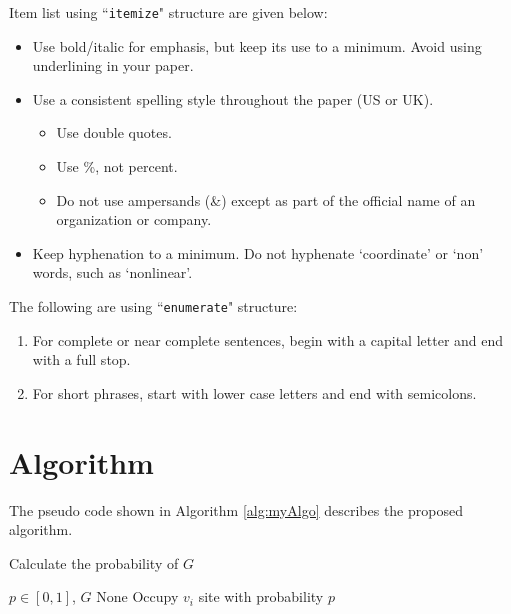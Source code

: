 Item list using ``\texttt{itemize}" structure are given below:

\begin{itemize} 
    
    \item  Use bold/italic for emphasis, but keep its use to a minimum. Avoid using underlining in your paper.
    \item  Use a consistent spelling style throughout the paper (US or UK).
    \begin{itemize}  %
        \item  Use double quotes.
        \item  Use \%, not percent.
        \item  Do not use ampersands (\&) except as part of the official name of an organization or company.
    \end{itemize}
    \item  Keep hyphenation to a minimum. Do not hyphenate `coordinate' or `non' words, such as `nonlinear'.
    
\end{itemize}

The following are using ``\texttt{enumerate}" structure:

\begin{enumerate} 
    
    \item  For complete or near complete sentences, begin with a capital letter and end with a full stop.
    \item  For short phrases, start with lower case letters and end with semicolons.
    
\end{enumerate}

    
\section{Algorithm}
    
    The pseudo code shown in Algorithm \ref{alg:myAlgo} describes the proposed algorithm.
    
    \begin{algorithm}
        \small{
            \caption{Calculate the probability of $G$}\label{alg:myAlgo}
            \begin{algorithmic} [1]
                \Require $p \in [0,1]$, $G$
                \Ensure None
                  
                \State Occupy $v_i$ site with probability $p$ 
                \EndIf
                \EndIf
                \EndFor
            \end{algorithmic}}
        \end{algorithm}
        

